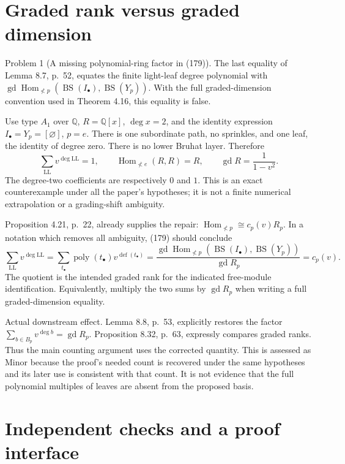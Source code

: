 \documentclass[10pt]{article}
\begin{document}
\section*{Graded rank versus graded dimension}
Problem 1 (A missing polynomial-ring factor in (179)).  The last equality of Lemma 8.7, p. 52, equates the finite light-leaf degree polynomial with \(\operatorname{gd}\operatorname{Hom}_{\not<p}(\operatorname{BS}(I_\bullet),\operatorname{BS}(Y_p))\). With the full graded-dimension convention used in Theorem 4.16, this equality is false.\par
Use type \(A_1\) over \(\mathbb Q\), \(R=\mathbb Q[x]\), \(\deg x=2\), and the identity expression \(I_\bullet=Y_p=[\varnothing]\), \(p=e\). There is one subordinate path, no sprinkles, and one leaf, the identity of degree zero. There is no lower Bruhat layer. Therefore \[\sum_{\mathrm{LL}}v^{\deg\mathrm{LL}}=1,\qquad
 \operatorname{Hom}_{\not<e}(R,R)=R,\qquad
 \operatorname{gd}R=\frac{1}{1-v^2}.\] The degree-two coefficients are respectively \(0\) and \(1\). This is an exact counterexample under all the paper’s hypotheses; it is not a finite numerical extrapolation or a grading-shift ambiguity.\par
Proposition 4.21, p. 22, already supplies the repair: \(\operatorname{Hom}_{\not<p}\cong c_p(v)R_p\). In a notation which removes all ambiguity, (179) should conclude \[\sum_{\mathrm{LL}}v^{\deg\mathrm{LL}}
 =\sum_{t_\bullet}\operatorname{poly}(t_\bullet)
                    v^{\operatorname{def}(t_\bullet)}
 =\frac{\operatorname{gd}\operatorname{Hom}_{\not<p}(\operatorname{BS}(I_\bullet),\operatorname{BS}(Y_p))}
        {\operatorname{gd}R_p}
 =c_p(v).\] The quotient is the intended graded rank for the indicated free-module identification. Equivalently, multiply the two sums by \(\operatorname{gd}R_p\) when writing a full graded-dimension equality.\par
Actual downstream effect. Lemma 8.8, p. 53, explicitly restores the factor \(\sum_{b\in B_p}v^{\deg b}=\operatorname{gd}R_p\). Proposition 8.32, p. 63, expressly compares graded ranks. Thus the main counting argument uses the corrected quantity. This is assessed as Minor because the proof’s needed count is recovered under the same hypotheses and its later use is consistent with that count. It is not evidence that the full polynomial multiples of leaves are absent from the proposed basis.\par
\section*{Independent checks and a proof interface}
\end{document}
